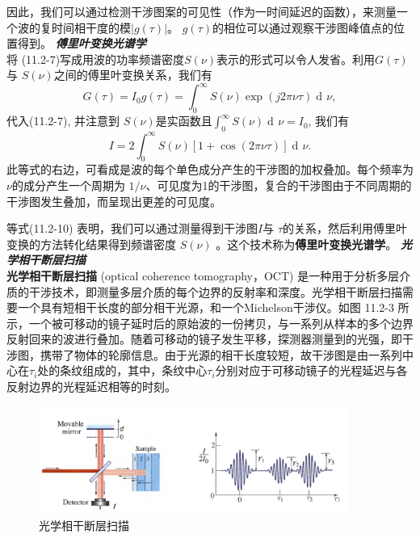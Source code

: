 \documentclass[UTF8]{ctexart}
\numberwithin{figure}{subsection}
\numberwithin{table}{subsection}
\DeclareMathOperator\dif{d\!}
\begin{document}
\par 因此，我们可以通过检测干涉图案的可见性（作为一时间延迟的函数），来测量一个波的复时间相干度的模$\lvert g(\tau) \rvert $。 $ g(\tau) $的相位可以通过观察干涉图峰值点的位置得到。
\bigbreak\noindent\textcolor{ksc}{\textbf{\textsl{傅里叶变换光谱学}}}\\
将 (11.2-7)写成用波的功率频谱密度$ S(\nu) $表示的形式可以令人发省。利用$ G(\tau) $ 与 $ S(\nu) $之间的傅里叶变换关系，我们有
\begin{equation}
G(\tau) = I_0 g(\tau) = \int_0^\infty S(\nu) \exp(j2\pi\nu\tau) \dif \nu ,
\end{equation}
代入(11.2-7), 并注意到 $ S(\nu) $是实函数且$ \int_0^\infty S(\nu) \dif \nu = I_0 $, 我们有
\begin{equation}
I = 2\int_0^\infty S(\nu) [1 + \cos(2\pi\nu\tau)] \dif \nu .
\end{equation}
此等式的右边，可看成是波的每个单色成分产生的干涉图的加权叠加。每个频率为$ \nu $的成分产生一个周期为 $ 1 / \nu $、可见度为1的干涉图，复合的干涉图由于不同周期的干涉图发生叠加，而呈现出更差的可见度。
\par 等式(11.2-10) 表明，我们可以通过测量得到干涉图$ I $与 $ \tau $的关系，然后利用傅里叶变换的方法转化结果得到频谱密度 $ S(\nu) $ 。这个技术称为\textbf{傅里叶变换光谱学}。
\bigbreak\noindent\textcolor{ksc}{\textbf{\textsl{光学相干断层扫描}}}\\
\textbf{光学相干断层扫描} (optical coherence tomography，OCT) 是一种用于分析多层介质的干涉技术，即测量多层介质的每个边界的反射率和深度。光学相干断层扫描需要一个具有短相干长度的部分相干光源，和一个Michelson干涉仪。如图 11.2-3 所示，一个被可移动的镜子延时后的原始波的一份拷贝，与一系列从样本的多个边界反射回来的波进行叠加。随着可移动的镜子发生平移，探测器测量到的光强，即干涉图，携带了物体的轮廓信息。由于光源的相干长度较短，故干涉图是由一系列中心在$\tau_i$处的条纹组成的，其中，条纹中心$\tau_i$分别对应于可移动镜子的光程延迟与各反射边界的光程延迟相等的时刻。
 \begin{figure}[H]
\centering
\includegraphics[width=0.9\textwidth]{11_2_3.PNG}
\caption{光学相干断层扫描}
\label{fig: 11_2_3}
\end{figure}
\end{document}
